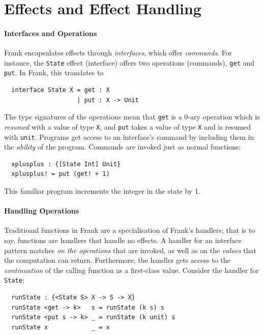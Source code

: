 \documentclass[msc,deptreport,cs]{infthesis} %
\newcommand{\code}[1]{\lstinline{#1}}
\begin{document}
\section{Effects and Effect Handling}

\paragraph*{Interfaces and Operations}

Frank encapsulates effects through \emph{interfaces}, which offer
\emph{commands}. For instance, the \code{State} effect (interface) offers two
operations (commands), \code{get} and \code{put}. In Frank, this translates to

\begin{lstlisting}
  interface State X = get : X
                    | put : X -> Unit
\end{lstlisting}

The type signatures of the operations mean that \code{get} is a 0-ary operation
which is \emph{resumed} with a value of type \code{X}, and \code{put} takes a value of
type \code{X} and is resumed with \code{unit}. Programs get access to an interface's
command by including them in the \emph{ability} of the program. Commands are
invoked just as normal functions;

\begin{lstlisting}
  xplusplus : {[State Int] Unit}
  xplusplus! = put (get! + 1)
\end{lstlisting}

\noindent This familiar program increments the integer in the state by 1.

\paragraph*{Handling Operations}

Traditioanl functions in Frank are a specialisation of Frank's handlers; that is
to say, functions are handlers that handle no effects. A handler for an
interface pattern matches \emph{on the operations} that are invoked, as well as
on the \emph{values} that the computation can return. Furthermore, the handler
gets access to the \emph{continuation} of the calling function as a first-class
value. Consider the handler for \code{State};

\begin{lstlisting}
  runState : {<State S> X -> S -> X}
  runState <get -> k>   s = runState (k s) s
  runState <put s -> k> _ = runState (k unit) s
  runState x            _ = x
\end{lstlisting}
\end{document}
